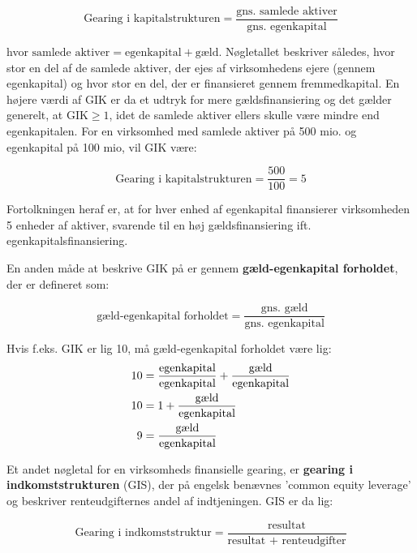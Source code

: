 \documentclass[10pt,reqno, usenames]{article}
\begin{document}
\begin{equation}
    \text{Gearing i kapitalstrukturen} = \frac{\text{gns. samlede aktiver}}{\text{gns. egenkapital}}
\end{equation}

hvor $\text{samlede aktiver} = \text{egenkapital} + \text{gæld}$. Nøgletallet beskriver således, hvor stor en del af de samlede aktiver, der ejes af virksomhedens ejere (gennem egenkapital) og hvor stor en del, der er finansieret gennem fremmedkapital. En højere værdi af GIK er da et udtryk for mere gældsfinansiering og det gælder generelt, at $\text{GIK} \ge 1$, idet de samlede aktiver ellers skulle være mindre end egenkapitalen. For en virksomhed med samlede aktiver på 500 mio. og egenkapital på 100 mio, vil GIK være: 

\begin{equation}
    \text{Gearing i kapitalstrukturen} = \frac{500}{100} = 5 \nonumber
\end{equation}

Fortolkningen heraf er, at for hver enhed af egenkapital finansierer virksomheden 5 enheder af aktiver, svarende til en høj gældsfinansiering ift. egenkapitalsfinansiering. 

\vspace{10 pt}

En anden måde at beskrive GIK på er gennem \textbf{gæld-egenkapital forholdet}, der er defineret som: 

\begin{equation}
    \text{gæld-egenkapital forholdet} = \frac{\text{gns. gæld}}{\text{gns. egenkapital}}
\end{equation}

Hvis f.eks. GIK er lig 10, må gæld-egenkapital forholdet være lig: 
\begin{align}
\centering
     10 & = \frac{\text{egenkapital}}{\text{egenkapital}} + \frac{\text{gæld}}{\text{egenkapital}} \nonumber \\
     10 & = 1 + \frac{\text{gæld}}{\text{egenkapital}} \nonumber \\
     9 & = \frac{\text{gæld}}{\text{egenkapital}} \nonumber
\end{align}

Et andet nøgletal for en virksomheds finansielle gearing, er \textbf{gearing i indkomststrukturen} (GIS), der på engelsk benævnes 'common equity leverage' og beskriver renteudgifternes andel af indtjeningen. GIS er da lig: 

\begin{equation}
        \text{Gearing i indkomststruktur} = \frac{\text{resultat}}{\text{resultat + renteudgifter}}
\end{equation}
\end{document}
